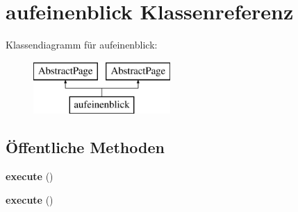 \hypertarget{classaufeinenblick}{}\section{aufeinenblick Klassenreferenz}
\label{classaufeinenblick}
Klassendiagramm für aufeinenblick\+:\begin{figure}[H]
\begin{center}
\leavevmode
\includegraphics[height=2.000000cm]{classaufeinenblick}
\end{center}
\end{figure}
\subsection*{Öffentliche Methoden}
\begin{DoxyCompactItemize}
\item 
\mbox{\label{classaufeinenblick_a0e5cfd4385bd6fbd5d9ab1db3853e52c}} 
{\bfseries execute} ()
\item 
\mbox{\label{classaufeinenblick_a0e5cfd4385bd6fbd5d9ab1db3853e52c}} 
{\bfseries execute} ()
\end{DoxyCompactItemize}
